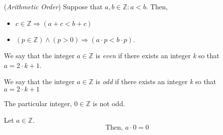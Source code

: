 \documentclass{article}
\def \proofDistance {5pt}
\def \subheaderSpace {10pt}
\newcommand{\Z}{\ensuremath{\mathbb{Z}}}
\begin{document}
        \begin{axiom}
            (\textit{Arithmetic Order}) Suppose that $a,b\in \Z \colon a < b.$ Then,
            \begin{itemize}
                \item $c\in \Z \Rightarrow (a + c < b + c)$
                \item $(p\in \Z) \land (p > 0) \Rightarrow (a\cdot p < b\cdot p)$.
            \end{itemize}
        \end{axiom}

\newpage

        
            \begin{definition}
                We say that the integer $a \in \Z$ is \textit{even} if there exists an integer \textit{k} so that $a = 2\cdot k+1$.
            \end{definition}
            \begin{definition}
                We say that the integer $a\in \Z$ is \textit{odd} if there exists an integer \textit{k} so that $a = 2\cdot k + 1$
            \end{definition}
        
            \begin{axiom}
                The particular integer, $0\in \Z$ is not odd.
            \end{axiom}
        
            \vspace{\subheaderSpace}
        
            \begin{theorem}
                Let $a\in \Z$. $$\text{Then, } a\cdot0 = 0$$
            \end{theorem}
        
            \vspace{\proofDistance}
        
\end{document}
